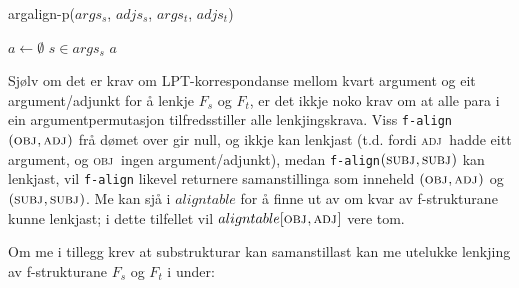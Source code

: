 \documentclass[11pt,a4paper,oneside,draft]{book}
\newcommand{\F}[2]{\textsc{#1}\ensuremath{_{#2}}}
\newcommand{\OBJ}{\F{obj}{}}
\newcommand{\OBJs}{\F{obj~}{}}
\newcommand{\ADJ}{\F{adj}{}}
\newcommand{\ADJs}{\F{adj~}{}}
\newcommand{\SUBJ}{\F{subj}{}}
\begin{document}
    
      \begin{algorithm}[]
      \caption{argalign-p($args_s$, $adjs_s$, $args_t$, $adjs_t$)}
      \label{algo:argalign-p}
    
      \BlankLine
      
     $a \gets \emptyset$\;
      {
           $s \in args_s$\;
            {
            }
            {
           }
             \Return $a$\;
         }
           {
          }
      \end{algorithm}

Sjølv om det er krav om LPT-korrespondanse mellom kvart argument og
eit argument/adjunkt for å lenkje $F_s$ og $F_t$, er det ikkje noko
krav om at alle para i ein argumentpermutasjon tilfredsstiller alle
lenkjingskrava. Viss \texttt{f-align}$(\OBJ,\ADJ)$ frå dømet over gir
null, og ikkje kan lenkjast (t.d. fordi \ADJs hadde eitt argument, og
\OBJs ingen argument/adjunkt), medan \texttt{f-align}$(\SUBJ,\SUBJ)$
kan lenkjast, vil \texttt{f-align} likevel returnere samanstillinga som
inneheld $(\OBJ,\ADJ)$ og $(\SUBJ,\SUBJ)$. Me kan sjå i $aligntable$
for å finne ut av om kvar av f-strukturane kunne lenkjast; i dette
tilfellet vil $aligntable[\OBJ,\ADJ]$ vere tom.


Om me i tillegg krev at substrukturar kan samanstillast kan me
utelukke lenkjing av f-strukturane $F_s$ og $F_t$ i \Next under:
\end{document}
